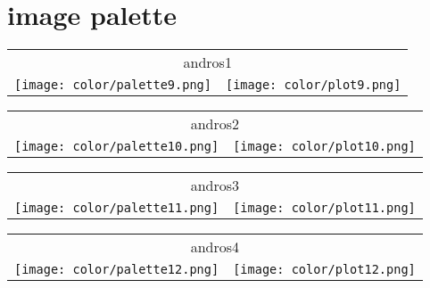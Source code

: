 \documentclass{article}
\begin{document}
\newpage
\section{image palette}

\begin{center}
\begin{tabular}{m{8cm}m{8cm}}
\multicolumn{2}{c}{andros1} \\
\texttt{[image: color/palette9.png]} &
\texttt{[image: color/plot9.png]}
\end{tabular}
\end{center}

\begin{center}
\begin{tabular}{m{8cm}m{8cm}}
\multicolumn{2}{c}{andros2} \\
\texttt{[image: color/palette10.png]} &
\texttt{[image: color/plot10.png]}
\end{tabular}
\end{center}

\begin{center}
\begin{tabular}{m{8cm}m{8cm}}
\multicolumn{2}{c}{andros3} \\
\texttt{[image: color/palette11.png]} &
\texttt{[image: color/plot11.png]}
\end{tabular}
\end{center}

\begin{center}
\begin{tabular}{m{8cm}m{8cm}}
\multicolumn{2}{c}{andros4} \\
\texttt{[image: color/palette12.png]} &
\texttt{[image: color/plot12.png]}
\end{tabular}
\end{center}
\end{document}
